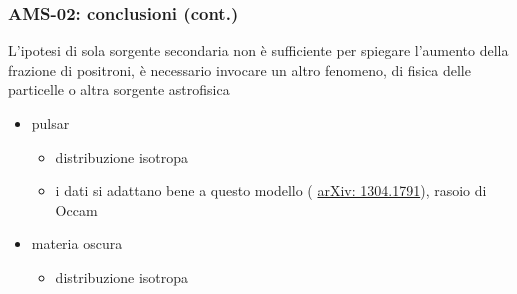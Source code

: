 \documentclass[10pt]{beamer}
\newcommand{\pro}{\color{alerted text.fg}{\ding{51}}}
\newcommand{\con}{\color{alerted text.fg}{\ding{55}}}
\begin{document}
\begin{frame}
  \frametitle{AMS-02: conclusioni (cont.)}
  L'ipotesi di \alert{sola sorgente secondaria non è sufficiente} per spiegare
  l'aumento della frazione di positroni, è necessario invocare un
  \alert{altro fenomeno}, di fisica delle particelle o altra sorgente
  astrofisica
  \pause{}
  \begin{itemize}
  \item<+-> pulsar
    \begin{itemize}
    \item[\con] distribuzione isotropa
    \item[\pro] i dati si adattano bene a questo modello
      ({
        \href{http://arxiv.org/abs/1304.1791}{arXiv: 1304.1791}}), rasoio di
      Occam
    \end{itemize}
  \item<+-> materia oscura
    \begin{itemize}
    \item[\con] distribuzione isotropa

\end{itemize}
\end{itemize}
\end{frame}
\end{document}

